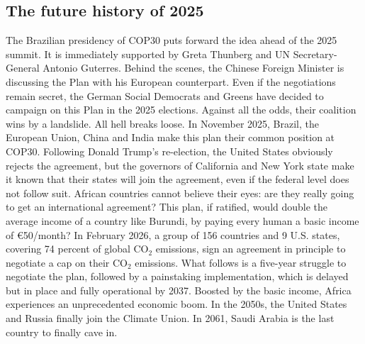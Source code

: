 \documentclass[a5paper,english,openany]{memoir}
\begin{document}
\subsection*{The future history of 2025} %
The Brazilian presidency of COP30 puts %
forward the idea ahead of the 2025 summit. It is immediately supported by Greta Thunberg and UN Secretary-General Antonio Guterres. 
Behind the scenes, the Chinese Foreign Minister is discussing the Plan with his European counterpart.  
Even if the negotiations remain secret, the German Social Democrats and Greens have decided to campaign on this Plan in the 2025 elections. 
Against all the odds, their coalition wins by a landslide. %
All hell breaks loose. In November 2025, Brazil, the European Union, China and India make this plan their common position at COP30. Following Donald Trump's re-election, the United States obviously rejects the agreement, but the governors of California and New York state make it known that their states will join the agreement, even if the federal level does not follow suit. African countries cannot %
believe their eyes: 
are they %
really going to get an international agreement?
This plan, if ratified, %
would double the average income of a country like Burundi, by paying every human a basic income of \euro{}50/month? In February 2026, a group of 156 countries and 9 U.S. states, covering 74 percent of global CO$_\text{2}$ emissions, sign an agreement in principle to negotiate a cap on their CO$_\text{2}$ emissions. What follows is a five-year struggle %
to negotiate the plan, followed by a painstaking implementation, which is delayed but in place and fully %
operational by 2037. Boosted by the basic income, Africa experiences an unprecedented economic boom. In the 2050s, the United States %
and Russia finally join the Climate Union. In 2061, Saudi Arabia is the last country to finally cave in. %
\end{document}
